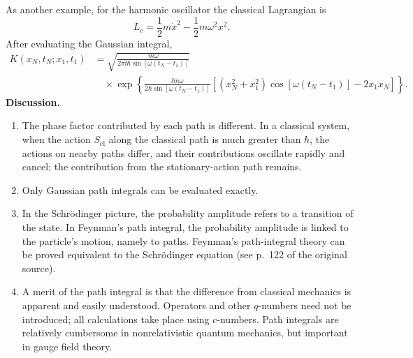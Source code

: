 As another example, for the harmonic oscillator the classical Lagrangian is
\begin{equation}
L_c=\frac12m\dot x^2-\frac12m\omega^2x^2.
\end{equation}
After evaluating the Gaussian integral,
\begin{equation}
\boxed{\begin{aligned}
K(x_N,t_N;x_1,t_1)
&=\sqrt{\frac{m\omega}{2\pi\ii\hbar\sin[\omega(t_N-t_1)]}}\\[-2pt]
&\quad\times\exp\left\{\frac{\ii m\omega}{2\hbar\sin[\omega(t_N-t_1)]}
\left[(x_N^2+x_1^2)\cos[\omega(t_N-t_1)]-2x_1x_N\right]\right\}.
\end{aligned}}
\end{equation}
\textbf{Discussion.}
\begin{enumerate}[label=(\arabic*)]
\item The phase factor contributed by each path is different. In a classical system, when the action $S_{\mathrm{cl}}$ along the classical path is much greater than $\hbar$, the actions on nearby paths differ, and their contributions oscillate rapidly and cancel; the contribution from the stationary-action path remains.
\item Only Gaussian path integrals can be evaluated exactly.
\item In the Schr\"odinger picture, the probability amplitude refers to a transition of the state. In Feynman's path integral, the probability amplitude is linked to the particle's motion, namely to paths. Feynman's path-integral theory can be proved equivalent to the Schr\"odinger equation (see p.~122 of the original source).
\item A merit of the path integral is that the difference from classical mechanics is apparent and easily understood. Operators and other $q$-numbers need not be introduced; all calculations take place using $c$-numbers. Path integrals are relatively cumbersome in nonrelativistic quantum mechanics, but important in gauge field theory.
\end{enumerate}

